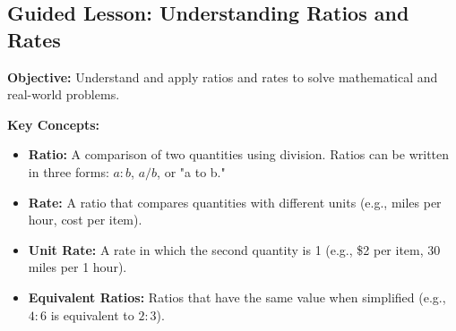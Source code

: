 \documentclass[12pt]{article}
\title{}
\date{}
\begin{document}
\subsection*{Guided Lesson: Understanding Ratios and Rates}
\onehalfspacing

\begin{tcolorbox}[colframe=black!40, colback=gray!5, 
coltitle=black, colbacktitle=black!20, fonttitle=\bfseries\Large, 
title=Learning Objective, halign title=center, left=5pt, right=5pt, top=5pt, bottom=15pt]
\textbf{Objective:} Understand and apply ratios and rates to solve mathematical and real-world problems.
\end{tcolorbox}

\begin{tcolorbox}[colframe=black!60, colback=white, 
coltitle=black, colbacktitle=black!15, fonttitle=\bfseries\Large, 
title=Key Concepts and Vocabulary, halign title=center, left=10pt, right=10pt, top=10pt, bottom=15pt]
\textbf{Key Concepts:}
\begin{itemize}
    \item \textbf{Ratio:} A comparison of two quantities using division. Ratios can be written in three forms: \( a:b \), \( a/b \), or "a to b."
    \item \textbf{Rate:} A ratio that compares quantities with different units (e.g., miles per hour, cost per item).
    \item \textbf{Unit Rate:} A rate in which the second quantity is 1 (e.g., \$2 per item, 30 miles per 1 hour).
    \item \textbf{Equivalent Ratios:} Ratios that have the same value when simplified (e.g., \( 4:6 \) is equivalent to \( 2:3 \)).
\end{itemize}
\end{tcolorbox}
\end{document}
